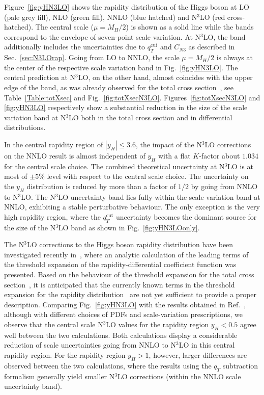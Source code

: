 \documentclass[12pt]{article}
\DeclareRobustCommand{\qt}{q_T}
\DeclareRobustCommand{\qtcut}{\ensuremath{q_T^\mathrm{cut}}}
\begin{document}
Figure~\ref{fig:yHN3LO} shows the rapidity distribution of the Higgs boson at LO (pale grey fill), NLO (green fill), NNLO (blue hatched) and N$^{3}$LO (red cross-hatched). 
The central scale ($\mu=M_{H}/2$) is shown as a solid line while the bands correspond to the envelope of seven-point scale variation. 
At N$^{3}$LO, the band additionally includes the uncertainties due to $\qtcut$ and $C_{N3}$ as described in Sec.~\ref{sec:N3LOrap}.
Going from LO to NNLO, the scale $\mu=M_{H}/2$ is always at the center of the respective scale variation band in Fig.~\ref{fig:yHN3LO}.  The central prediction at N$^{3}$LO, on the other hand, almost coincides with the upper edge of the band, as was already observed for the total cross section~\cite{Anastasiou:2015ema,Mistlberger:2018etf}, see Table~\ref{Table:totXsec} and Fig.~\ref{fig:totXsecN3LO}.
Figures~\ref{fig:totXsecN3LO} and \ref{fig:yHN3LO} respectively show a substantial reduction in the size of the scale variation band at N$^{3}$LO both in the total cross section and in differential distributions.

In the central rapidity region of $|y_{H}| \leq 3.6$, the impact of the N$^{3}$LO corrections on the NNLO result is almost independent of $y_{H}$ with a flat $K$-factor about $1.034$ for the central scale choice. The combined theoretical uncertainty at N$^3$LO is at most of $\pm 5 \%$ level with respect to the central scale choice. The uncertainty on the $y_H$ distribution is reduced by more than a factor of $1/2$ by going from NNLO to N$^3$LO. The N$^3$LO uncertainty band lies fully within the scale variation band at NNLO, exhibiting a stable perturbative behaviour. 
The only exception is the very high rapidity region, where the $\qtcut$ uncertainty becomes the dominant source for the size of the N$^{3}$LO band as shown in Fig.~\ref{fig:yHN3LOonly}.

The N$^3$LO corrections to the Higgs boson rapidity distribution have been investigated recently in~\cite{Dulat:2017prg},
where an analytic calculation of the leading terms of the threshold expansion of the  rapidity-differential coefficient function 
was presented. Based on the behaviour of the threshold expansion for the total cross section~\cite{Anastasiou:2015ema}, 
it is anticipated that the currently known terms in the threshold expansion for the rapidity distribution~\cite{Dulat:2017prg} are not yet sufficient to provide a proper description.  
Comparing Fig.~\ref{fig:yHN3LO} with the results obtained in Ref.~\cite{Dulat:2017prg}, although with different choices of PDFs and scale-variation prescriptions, we observe that the central scale N$^3$LO values for the rapidity region $y_H < 0.5$ agree well between the two calculations. Both calculations display a considerable reduction of scale uncertainties going from NNLO to N$^3$LO in this central rapidity region. 
For the rapidity region $y_H > 1$, however, larger differences are observed between the two calculations, where the results using the $\qt$ subtraction formalism generally yield smaller N$^3$LO corrections 
(within the NNLO scale uncertainty band).
\end{document}
